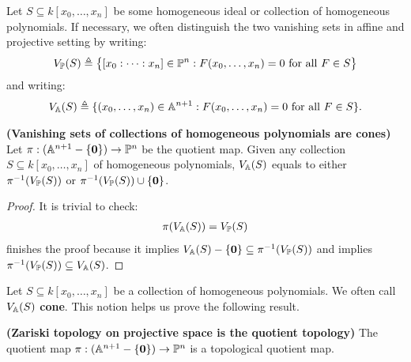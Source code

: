 \documentclass{report}
\begin{document}
Let $S\subseteq k[x_0,\dots ,x_n]$ be some homogeneous ideal or collection of homogeneous polynomials.  If necessary, we often distinguish the two vanishing sets in affine and projective setting by writing: 
\begin{align*}
V_\P(S)\triangleq  \big\{[x_0:\cdots :x_n] \in \P^n : F(x_0,\dots ,x_n)=0\text{ for all }F\in S\big\}
\end{align*}
and writing:
\begin{align*}
  V_\A(S) \triangleq  \set{(x_0,\dots ,x_n) \in \A^{n+1} : F(x_0,\dots ,x_n)=0\text{ for all }F \in S}. 
\end{align*}
\begin{theorem}
\label{Vso}
  \textbf{(Vanishing sets of collections of homogeneous polynomials are cones)} Let $\pi  :(\A^{n+1}-\set{\textbf{0}})\rightarrow \P^n$  be the quotient map. Given any collection $S\subseteq k[x_0,\dots ,x_n]$ of homogeneous polynomials, $V_\A(S)$ equals to either $\pi ^{-1}(V_\P(S))$ or  $\pi ^{-1}(V_\P(S))\cup  \set{\textbf{0}}$. 
\end{theorem}
\begin{proof}
It is trivial to check: 
\begin{align}
\label{pva}
\pi  (V_\A(S))= V_\P(S)
\end{align}
 finishes the proof because it implies $V_\A(S)-\set{\textbf{0}}\subseteq \pi ^{-1}(V_\P(S))$ and implies $\pi ^{-1}(V_\P(S))\subseteq V_\A(S)$.
\end{proof}
Let $S\subseteq k[x_0,\dots ,x_n]$ be a collection of homogeneous polynomials. We often call $V_\A(S)$ \textbf{cone}. This notion helps us prove the following result. 
\begin{theorem}
\textbf{(Zariski topology on projective space is the quotient topology)} The quotient map $\pi :(\A^{n+1}-\set{\textbf{0}})\rightarrow \P^n$ is a topological quotient map. 
\end{theorem}
\end{document}
